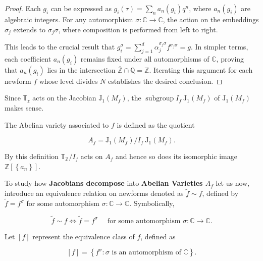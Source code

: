 \begin{corollary}
\begin{proof}
Each \(g_{i}\) can be expressed as \(g_{i}(\tau)=\sum_{n} a_{n}\left(g_{i}\right) q^{n}\), where \(a_{n}\left(g_{i}\right)\) are algebraic integers. For any automorphism \(\sigma: \mathbb{C} \longrightarrow \mathbb{C}\), the action on the embeddings \(\sigma_{j}\) extends to \(\sigma_{j} \sigma\), where composition is performed from left to right.

This leads to the crucial result that \(g_{i}^{\sigma}=\sum_{j=1}^{d} \alpha_{j}^{\sigma_{j} \sigma} f^{\sigma_{j} \sigma}=g\). In simpler terms, each coefficient \(a_{n}\left(g_{i}\right)\) remains fixed under all automorphisms of \(\mathbb{C}\), proving that \(a_{n}\left(g_{i}\right)\) lies in the intersection \(\overline{\mathbb{Z}} \cap \mathbb{Q}=\mathbb{Z}\). Iterating this argument for each newform \(f\) whose level divides \(N\) establishes the desired conclusion.
    \end{proof}
\end{corollary}

Since $\mathbb{T}_{\mathbb{z}}$ acts on the Jacobian $\mathrm{J}_{1}\left(M_{f}\right)$, the $\operatorname{subgroup} I_{f} \mathrm{~J}_{1}\left(M_{f}\right)$ of $\mathrm{J}_{1}\left(M_{f}\right)$ makes sense.

\begin{definition}
    The Abelian variety associated to $f$ is defined as the quotient

$$
A_{f}=\mathrm{J}_{1}\left(M_{f}\right) / I_{f} \mathrm{~J}_{1}\left(M_{f}\right) .
$$

\end{definition}
By this definition $\mathbb{T}_{\mathbb{Z}} / I_{f}$ acts on $A_{f}$ and hence so does its isomorphic image $\mathbb{Z}\left[\left\{a_{n}\right\}\right]$.

\vspace{1cm}


To study how \textbf{Jacobians decompose} into \textbf{Abelian Varieties $A_f$} let us now, introduce an equivalence relation on newforms denoted as \(\tilde{f} \sim f\), defined by \(\tilde{f}=f^{\sigma}\) for some automorphism \(\sigma: \mathbb{C} \longrightarrow \mathbb{C}\). Symbolically,

\[ \tilde{f} \sim f \Longleftrightarrow \tilde{f}=f^{\sigma} \quad \text { for some automorphism } \sigma: \mathbb{C} \longrightarrow \mathbb{C} . \]

Let \([f]\) represent the equivalence class of \(f\), defined as

\[ [f]=\left\{f^{\sigma}: \sigma \text { is an automorphism of } \mathbb{C}\right\} . \]

